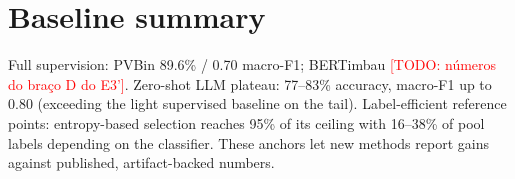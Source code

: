 \documentclass[11pt]{article}
\newcommand{\todo}[1]{\textcolor{red}{[TODO: #1]}}
\begin{document}
\section{Baseline summary}
\label{sec:baselines}

Full supervision: PVBin 89.6\% / 0.70 macro-F1; BERTimbau
\todo{números do braço D do E3'}. Zero-shot LLM plateau: 77--83\%
accuracy, macro-F1 up to 0.80 (exceeding the light supervised baseline
on the tail). Label-efficient reference points: entropy-based selection
reaches 95\% of its ceiling with 16--38\% of pool labels depending on
the classifier. These anchors let new methods report gains against
published, artifact-backed numbers.



\end{document}
